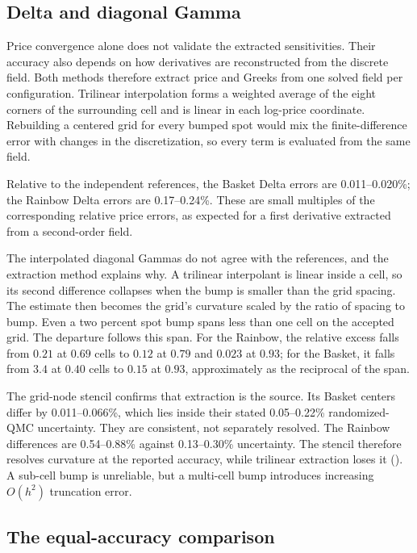 \subsection{Delta and diagonal Gamma}\label{sec:validation-greeks}

Price convergence alone does not validate the extracted sensitivities. Their accuracy also depends on how derivatives are reconstructed from the discrete field. Both methods therefore extract price and Greeks from one solved field per configuration. Trilinear interpolation forms a weighted average of the eight corners of the surrounding cell and is linear in each log-price coordinate. Rebuilding a centered grid for every bumped spot would mix the finite-difference error with changes in the discretization, so every term is evaluated from the same field.

Relative to the independent references, the Basket Delta errors are 0.011--0.020\%; the Rainbow Delta errors are 0.17--0.24\%. These are small multiples of the corresponding relative price errors, as expected for a first derivative extracted from a second-order field.

The interpolated diagonal Gammas do not agree with the references, and the extraction method explains why. A trilinear interpolant is linear inside a cell, so its second difference collapses when the bump is smaller than the grid spacing. The estimate then becomes the grid's curvature scaled by the ratio of spacing to bump. Even a two percent spot bump spans less than one cell on the accepted grid. The departure follows this span. For the Rainbow, the relative excess falls from $0.21$ at $0.69$ cells to $0.12$ at $0.79$ and $0.023$ at $0.93$; for the Basket, it falls from $3.4$ at $0.40$ cells to $0.15$ at $0.93$, approximately as the reciprocal of the span.

The grid-node stencil confirms that extraction is the source. Its Basket centers differ by 0.011--0.066\%, which lies inside their stated 0.05--0.22\% randomized-QMC uncertainty. They are consistent, not separately resolved. The Rainbow differences are 0.54--0.88\% against 0.13--0.30\% uncertainty. The stencil therefore resolves curvature at the reported accuracy, while trilinear extraction loses it (). A sub-cell bump is unreliable, but a multi-cell bump introduces increasing $O(h^2)$ truncation error.

\subsection{The equal-accuracy comparison}\label{sec:validation-equal}

